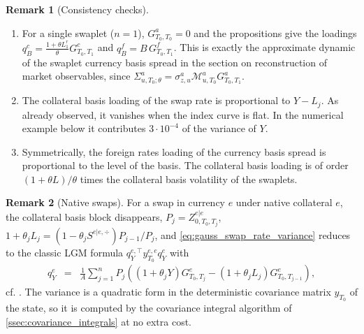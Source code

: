 \documentclass[11pt,english]{amsart}
\theoremstyle{definition}
\newtheorem{rema}{Remark}
\begin{document}
\begin{rema}[Consistency checks]
\begin{enumerate}
\item For a single swaplet ($n=1$), $G^{a}_{T_0,T_0}=0$ and the propositions give the loadings $q^c_B = \frac{1+\theta L^{r}_{1}}{\theta} G^c_{T_0,T_1}$ and $q^f_B = B\, G^f_{T_0,T_1}$. This is exactly the approximate dynamic of the swaplet currency basis spread in the section on reconstruction of market observables, since $\Sigma^{a}_{u,T_0;\theta} = \sigma^a_{z,u}\mathcal{M}^a_{u,T_0}G^a_{T_0,T_1}$.
\item The collateral basis loading of the swap rate is proportional to $Y - L_j$. As already observed, it vanishes when the index curve is flat. In the numerical example below it contributes $3\cdot 10^{-4}$ of the variance of $Y$.
\item Symmetrically, the foreign rates loading of the currency basis spread is proportional to the level of the basis. The collateral basis loading is of order $(1+\theta L)/\theta$ times the collateral basis volatility of the swaplets.
\end{enumerate}
\end{rema}

\begin{rema}[Native swaps]\label{rema:gauss_native}
For a swap in currency $e$ under native collateral $e$, the collateral basis block disappears, $P_j = Z^{e|e}_{0,T_0,T_j}$, $1+\theta_jL_j = (1-\theta_jS^{e|e,\div})P_{j-1}/P_j$, and \eqref{eq:gauss_swap_rate_variance} reduces to the classic LGM formula $q^{e,\top}_Y y^{e,e}_{T_0} q^e_Y$ with
\begin{eqnarray*}
  q^e_Y &=& \frac{1}{A}\sum_{j=1}^n P_j\left( (1+\theta_j Y) G^e_{T_0,T_j} - (1+\theta_jL_j)G^e_{T_0,T_{j-1}}\right) ,
\end{eqnarray*}
cf. \cite[\S13]{AndersenPiterbarg}. The variance is a quadratic form in the deterministic covariance matrix $y_{T_0}$ of the state, so it is computed by the covariance integral algorithm of \autoref{ssec:covariance_integrals} at no extra cost.
\end{rema}
\end{document}
